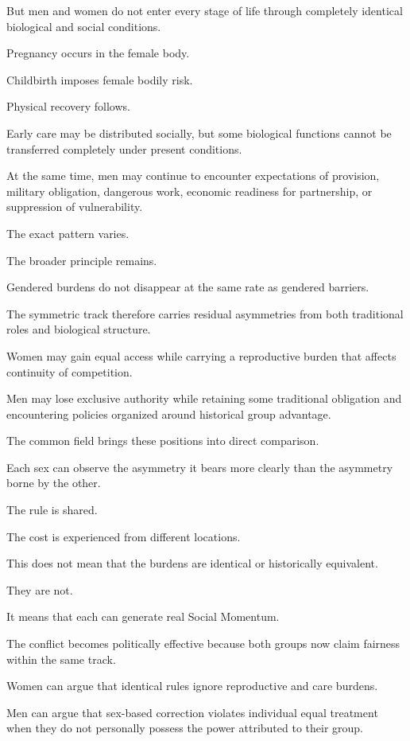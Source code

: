 But men and women do not enter every stage of life through completely identical biological and social conditions.

Pregnancy occurs in the female body.

Childbirth imposes female bodily risk.

Physical recovery follows.

Early care may be distributed socially, but some biological functions cannot be transferred completely under present conditions.

At the same time, men may continue to encounter expectations of provision, military obligation, dangerous work, economic readiness for partnership, or suppression of vulnerability.

The exact pattern varies.

The broader principle remains.

Gendered burdens do not disappear at the same rate as gendered barriers.

The symmetric track therefore carries residual asymmetries from both traditional roles and biological structure.

Women may gain equal access while carrying a reproductive burden that affects continuity of competition.

Men may lose exclusive authority while retaining some traditional obligation and encountering policies organized around historical group advantage.

The common field brings these positions into direct comparison.

Each sex can observe the asymmetry it bears more clearly than the asymmetry borne by the other.

The rule is shared.

The cost is experienced from different locations.

This does not mean that the burdens are identical or historically equivalent.

They are not.

It means that each can generate real Social Momentum.

The conflict becomes politically effective because both groups now claim fairness within the same track.

Women can argue that identical rules ignore reproductive and care burdens.

Men can argue that sex-based correction violates individual equal treatment when they do not personally possess the power attributed to their group.

